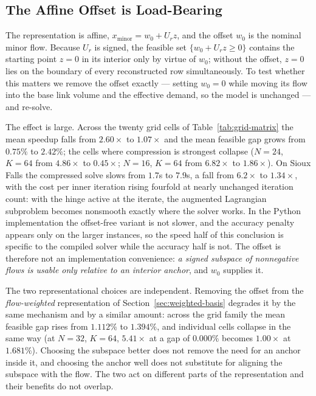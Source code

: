 \documentclass[11pt]{article}
\begin{document}
\subsection{The Affine Offset is Load-Bearing}
\label{sec:offset-study}


The representation is affine, $x_{\text{minor}}=w_0+U_rz$, and the offset $w_0$ is the
nominal minor flow. Because $U_r$ is signed, the feasible set $\{w_0+U_rz\ge0\}$ contains the
starting point $z=0$ in its interior only by virtue of $w_0$; without the offset, $z=0$ lies
on the boundary of every reconstructed row simultaneously. To test whether this matters we
remove the offset exactly --- setting $w_0=0$ while moving its flow into the base link volume
and the effective demand, so the model is unchanged --- and re-solve.

The effect is large. Across the twenty grid cells of Table~\ref{tab:grid-matrix} the mean
speedup falls from $2.60\times$ to $1.07\times$ and the mean feasible gap grows from $0.75\%$
to $2.42\%$; the cells where compression is strongest collapse ($N=24$, $K=64$ from
$4.86\times$ to $0.45\times$; $N=16$, $K=64$ from $6.82\times$ to $1.86\times$). On Sioux
Falls the compressed solve slows from $1.7$s to $7.9$s, a fall from $6.2\times$ to
$1.34\times$, with the cost per inner iteration rising fourfold at nearly unchanged iteration
count: with the hinge active at the iterate, the augmented Lagrangian subproblem becomes
nonsmooth exactly where the solver works. In the Python implementation the offset-free
variant is not slower, and the accuracy penalty appears only on the larger instances, so the
speed half of this conclusion is specific to the compiled solver while the accuracy half is
not. The offset is therefore not an implementation convenience: \emph{a signed subspace of
nonnegative flows is usable only relative to an interior anchor}, and $w_0$ supplies it.

The two representational choices are independent. Removing the offset from the
\emph{flow-weighted} representation of Section~\ref{sec:weighted-basis} degrades it by the same
mechanism and by a similar amount: across the grid family the mean feasible gap rises from
$1.112\%$ to $1.394\%$, and individual cells collapse in the same way (at $N=32$, $K=64$,
$5.41\times$ at a gap of $0.000\%$ becomes $1.00\times$ at $1.681\%$). Choosing the subspace
better does not remove the need for an anchor inside it, and choosing the anchor well does not
substitute for aligning the subspace with the flow. The two act on different parts of the
representation and their benefits do not overlap.
\end{document}
